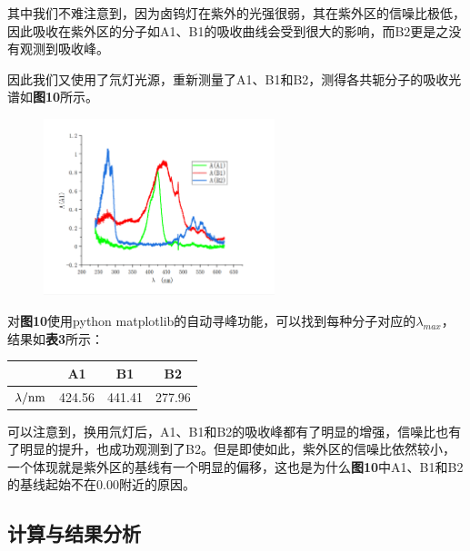 \documentclass[12pt]{article}
\begin{document}
			其中我们不难注意到，因为卤钨灯在紫外的光强很弱，其在紫外区的信噪比极低，因此吸收在紫外区的分子如A1、B1的吸收曲线会受到很大的影响，而B2更是之没有观测到吸收峰。\par
			因此我们又使用了氘灯光源，重新测量了A1、B1和B2，测得各共轭分子的吸收光谱如\textbf{图10}所示。\par
			\begin{figure}[h]
				\centering
				\includegraphics[width=0.6\textwidth]{10.png}
			\end{figure}
			\par
			对\textbf{图10}使用python matplotlib的自动寻峰功能，可以找到每种分子对应的$\lambda_{max}$，结果如\textbf{表3}所示：\par
			\begin{table}[h]
				\centering
				\begin{tabular}{cccc}
					\toprule
					& A1 & B1 & B2\\
					\midrule
					$\lambda/{\rm nm}$ 	& 424.56 & 441.41 & 277.96 \\
					\bottomrule
				\end{tabular}
			\end{table}
			\par
			可以注意到，换用氘灯后，A1、B1和B2的吸收峰都有了明显的增强，信噪比也有了明显的提升，也成功观测到了B2。但是即使如此，紫外区的信噪比依然较小，一个体现就是紫外区的基线有一个明显的偏移，这也是为什么\textbf{图10}中A1、B1和B2的基线起始不在0.00附近的原因。\par

			\subsection{计算与结果分析}
\end{document}
